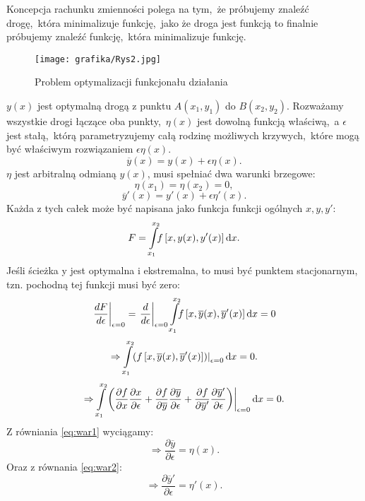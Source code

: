 Koncepcja rachunku zmienności polega na tym,~że próbujemy znaleźć drogę,~która minimalizuje funkcję,~jako że droga jest funkcją to finalnie próbujemy znaleźć funkcję,~która minimalizuje funkcję.
%
\begin{figure}[htb]
    \centering
    \texttt{[image: grafika/Rys2.jpg]}
    \caption{\label{fig:RównanieLE}Problem optymalizacji funkcjonału działania}
\end{figure}
%
$y(x)$ jest optymalną drogą z punktu $A(x_1,y_1)$ do $B(x_2,y_2)$. Rozważamy wszystkie drogi łączące oba punkty,~$\eta(x)$ jest dowolną funkcją właściwą,~a $\epsilon$ jest stałą,~którą parametryzujemy całą rodzinę możliwych krzywych,~które mogą być właściwym rozwiązaniem $\epsilon\eta(x)$.
%
\begin{equation}\label{eq:war1}\overline{y}(x)=y(x)+\epsilon\eta(x).\end{equation}
%
$\eta$ jest arbitralną odmianą $y(x)$, musi spełniać dwa warunki brzegowe:
%
$$\eta(x_1)=\eta(x_2)=0,$$
%
\begin{equation}\label{eq:war2}\overline{y}'(x)=y'(x)+\epsilon\eta'(x).\end{equation}
%
Każda z tych całek może być napisana jako funkcja funkcji ogólnych $x,y,y'$:
%
$$F=\int\limits_{x_1}^{x_2}\!\!f\left[{x,y(x),y'(x)}\right]{\rm d}{x}.$$
%
Jeśli ścieżka y jest optymalna i ekstremalna, to musi być punktem stacjonarnym, tzn. pochodną tej funkcji musi być zero:
%
$$\left.\frac{dF}{d\epsilon}\right|_{\epsilon=0}=\left.\frac{d}{d\epsilon}\right|_{\epsilon=0}\int\limits_{x_1}^{x_2}\!\!f\left[{x,\overline{y}(x),\overline{y}'(x)}\right]{\rm d}{x}=0$$
%
$$\Rightarrow \int\limits_{x_1}^{x_2}\!\!\left.\left({f\left[{x,\overline{y}(x),\overline{y}'(x)}\right]}\right)\right|_{\epsilon=0}{\rm d}{x}=0.$$
%
$$\Rightarrow \int\limits_{x_1}^{x_2}\!\left.\left(\frac{\partial f}{\partial x} \frac{\partial x}{\partial \epsilon}+\frac{\partial f}{\partial \overline{y}}\frac{\partial \overline{y}}{\partial \epsilon}+\frac{\partial f}{\partial \overline{y}'}\frac{\partial \overline{y}'}{\partial \epsilon}\right)\right|_{\epsilon=0}{\rm d}{x}=0.$$
%
Z równiania \ref{eq:war1} wyciągamy:
\begin{equation}\label{eq:upro1}
    \Rightarrow \frac{\partial \overline{y}}{\partial \epsilon}=\eta(x).
\end{equation}
Oraz z równania \ref{eq:war2}:
\begin{equation}\label{eq:upro2}
    \Rightarrow \frac{\partial \overline{y}'}{\partial \epsilon}=\eta '(x).
\end{equation}
